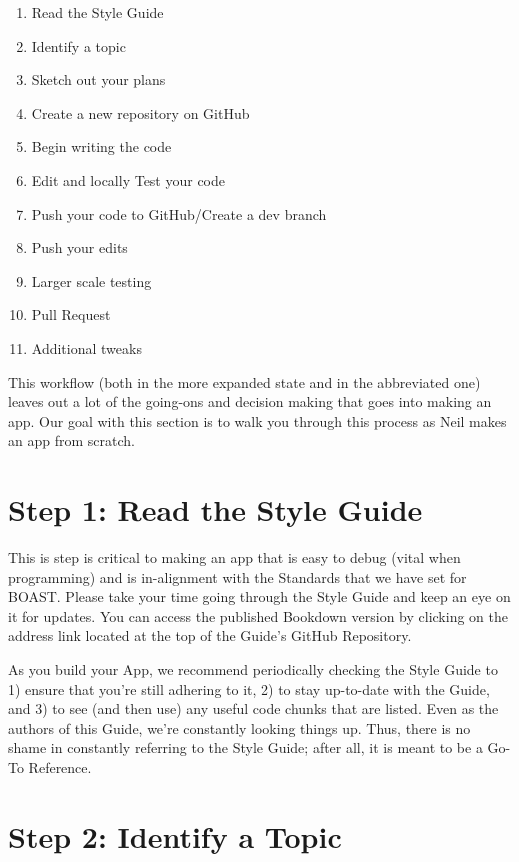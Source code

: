 \documentclass[
]{book}
\providecommand{\tightlist}{%
  \setlength{\itemsep}{0pt}\setlength{\parskip}{0pt}}
\begin{document}
\begin{enumerate}
\def\labelenumi{\arabic{enumi}.}
\tightlist
\item
  Read the Style Guide
\item
  Identify a topic
\item
  Sketch out your plans
\item
  Create a new repository on GitHub
\item
  Begin writing the code
\item
  Edit and locally Test your code
\item
  Push your code to GitHub/Create a dev branch
\item
  Push your edits
\item
  Larger scale testing
\item
  Pull Request
\item
  Additional tweaks
\end{enumerate}

This workflow (both in the more expanded state and in the abbreviated one) leaves out a lot of the going-ons and decision making that goes into making an app. Our goal with this section is to walk you through this process as Neil makes an app from scratch.

\hypertarget{step1}{%
\section{Step 1: Read the Style Guide}\label{step1}}

This is step is critical to making an app that is easy to debug (vital when programming) and is in-alignment with the Standards that we have set for BOAST. Please take your time going through the Style Guide and keep an eye on it for updates. You can access the published Bookdown version by clicking on the address link located at the top of the Guide's GitHub Repository.

As you build your App, we recommend periodically checking the Style Guide to 1) ensure that you're still adhering to it, 2) to stay up-to-date with the Guide, and 3) to see (and then use) any useful code chunks that are listed. Even as the authors of this Guide, we're constantly looking things up. Thus, there is no shame in constantly referring to the Style Guide; after all, it is meant to be a Go-To Reference.

\hypertarget{step2}{%
\section{Step 2: Identify a Topic}\label{step2}}
\end{document}
